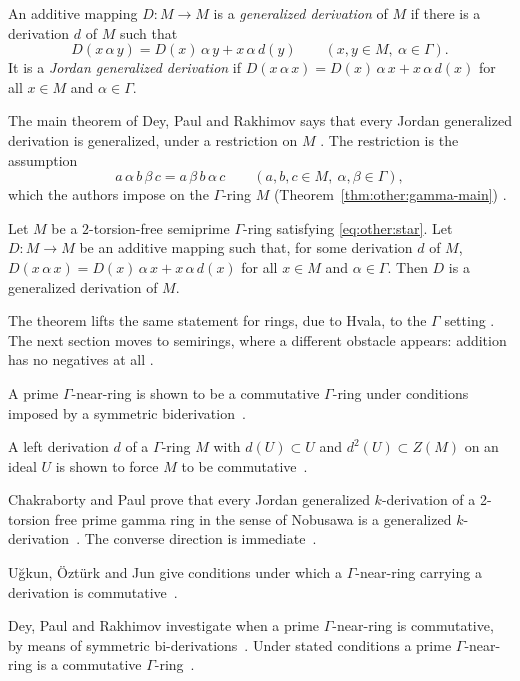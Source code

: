 \begin{definition}\label{def:other:gamma-generalized}
An additive mapping $D \colon M \to M$ is a \emph{generalized derivation}
of $M$ if there is a derivation $d$ of $M$ such that
\[
D(x\,\alpha\,y) = D(x)\,\alpha\,y + x\,\alpha\,d(y)
\qquad (x, y \in M,\ \alpha \in \Gamma).
\]
It is a \emph{Jordan generalized derivation} if
$D(x\,\alpha\,x) = D(x)\,\alpha\,x + x\,\alpha\,d(x)$ for all $x \in M$
and $\alpha \in \Gamma$.
\end{definition}

The main theorem of Dey, Paul and Rakhimov says that every Jordan
generalized derivation is generalized, under a restriction on $M$
\cite[Abstract, p.~1]{DeyPaulRakhimov2012}. The
restriction is the assumption
\begin{equation}\label{eq:other:star}
a\,\alpha\,b\,\beta\,c = a\,\beta\,b\,\alpha\,c
\qquad (a, b, c \in M,\ \alpha, \beta \in \Gamma),
\end{equation}
which the authors impose on the $\Gamma$-ring $M$ (Theorem~\ref{thm:other:gamma-main})
\cite[pp.~1--2]{DeyPaulRakhimov2012}.\begin{theorem}\label{thm:other:gamma-main}
Let $M$ be a $2$-torsion-free semiprime $\Gamma$-ring satisfying
\eqref{eq:other:star}. Let $D \colon M \to M$ be an additive mapping such
that, for some derivation $d$ of $M$,
$D(x\,\alpha\,x) = D(x)\,\alpha\,x + x\,\alpha\,d(x)$ for all $x \in M$
and $\alpha \in \Gamma$. Then $D$ is a generalized derivation of $M$.
\end{theorem}

The theorem lifts the same statement for rings, due to Hvala, to the
$\Gamma$ setting \cite[p.~1]{DeyPaulRakhimov2012}. The next section moves
to semirings, where a different obstacle appears: addition has no
negatives at all \cite[p.~625]{AhmedDudek2021}.

A prime $\Gamma$-near-ring is shown to be a commutative $\Gamma$-ring under
conditions imposed by a symmetric biderivation~\cite{WlOnCommutativityIn2014}.

A left derivation $d$ of a $\Gamma$-ring $M$ with $d(U)\subset U$ and
$d^2(U)\subset Z(M)$ on an ideal $U$ is shown to force $M$ to be
commutative~\cite{WlTheCommutativityInPrimeGammaRi2018}.

Chakraborty and Paul prove that every Jordan generalized $k$-derivation of a
2-torsion free prime gamma ring in the sense of Nobusawa is a generalized
$k$-derivation~\cite{WlOnJordanGeneralizedKDerivation2007}. The converse direction is
immediate~\cite{WlOnJordanGeneralizedKDerivation2007}.

U\u{g}kun, \"Ozt\"urk and Jun give conditions under which a $\Gamma$-near-ring
carrying a derivation is
commutative~\cite{WlOnPrimeGammaNearRingsWithDeriv2004}.

Dey, Paul and Rakhimov investigate when a prime $\Gamma$-near-ring is
commutative, by means of symmetric bi-derivations~\cite{WlOnCommutativityInPrimeGammaNea2014}. Under stated
conditions a prime $\Gamma$-near-ring is a commutative
$\Gamma$-ring~\cite{WlOnCommutativityInPrimeGammaNea2014}.
